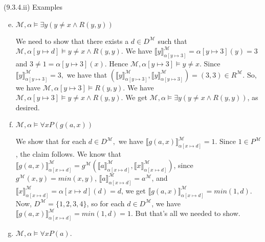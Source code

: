\begin{frame}{(9.3.4.ii) Examples}

{\small
	\begin{enumerate}[(a)]
	\setcounter{enumi}{4}


\item $\mathcal{M},\alpha\vDash \exists y (y\neq x\land R(y,y))$
				
				We need to show that there exists a $d\in D^\mathcal{M}$ such that $\mathcal{M},\alpha[y\mapsto d]\vDash y\neq x\land R(y,y)$. We have $\llbracket y\rrbracket^\mathcal{M}_{\alpha[y\mapsto 3]}=\alpha[y\mapsto 3](y)=3$  and $3\neq 1=\alpha[y\mapsto 3](x)$. Hence $\mathcal{M},\alpha[y\mapsto 3]\vDash y\neq x$. Since $\llbracket y\rrbracket^\mathcal{M}_{\alpha[y\mapsto 3]}=3,$ we have that $(\llbracket y\rrbracket^\mathcal{M}_{\alpha[y\mapsto 3]},\llbracket y\rrbracket^\mathcal{M}_{\alpha[y\mapsto 3]})=(3,3)\in R^\mathcal{M}$. So, we have $\mathcal{M},\alpha[y\mapsto 3]\vDash R(y,y)$. We have $\mathcal{M},\alpha[y\mapsto 3]\vDash y\neq x\land R(y,y)$. We get $\mathcal{M},\alpha\vDash \exists y (y\neq x\land R(y,y))$, as desired.
				
				\item $\mathcal{M},\alpha\vDash \forall x P(g(a,x))$
				
				 We show that for each $d\in D^\mathcal{M},$ we have $\llbracket g(a,x)\rrbracket^\mathcal{M}_{\alpha[x\mapsto d]}=1$. Since $1\in P^\mathcal{M}$, the claim follows.  We know that $\llbracket g(a,x)\rrbracket^\mathcal{M}_{\alpha[x\mapsto d]}=g^\mathcal{M}(\llbracket a\rrbracket^\mathcal{M}_{\alpha[x\mapsto d]}, \llbracket x\rrbracket^\mathcal{M}_{\alpha[x\mapsto d]})$, since $g^\mathcal{M}(x,y)=min(x,y)$, $\llbracket a\rrbracket^\mathcal{M}_{\alpha[x\mapsto d]}=a^\mathcal{M}$, and $\llbracket x\rrbracket^\mathcal{M}_{\alpha[x\mapsto d]}=\alpha[x\mapsto d](d)=d$, we get $\llbracket g(a,x)\rrbracket^\mathcal{M}_{\alpha[x\mapsto d]}=min(1,d)$. Now, $D^\mathcal{M}=\{1,2,3,4\}$, so for each $d\in D^\mathcal{M}$, we have $\llbracket g(a,x)\rrbracket^\mathcal{M}_{\alpha[x\mapsto d]}=min(1,d)=1$. But that's all we needed to show.
				
				\item $\mathcal{M},\alpha\vDash \forall x P(a)$. 
				
			
			\end{enumerate}
			}
	\end{frame}
	
